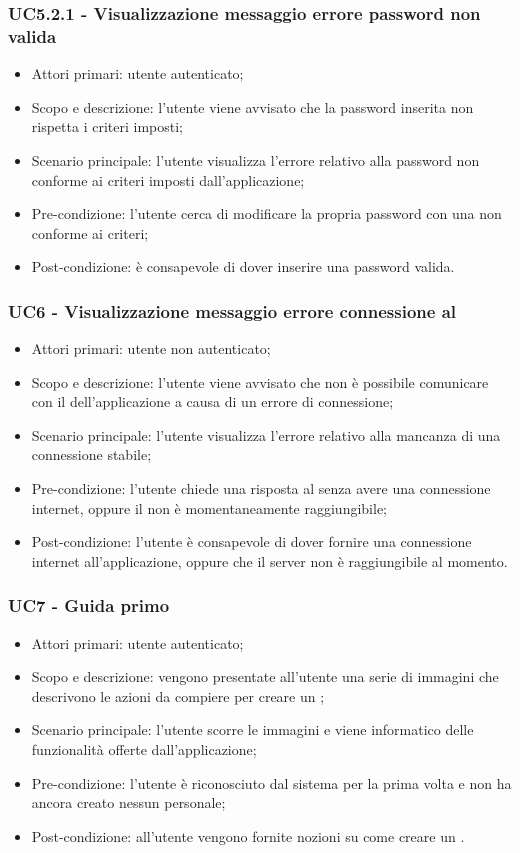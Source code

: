 \subsubsection{UC5.2.1 - Visualizzazione messaggio errore password non valida}
\begin{itemize}
	\item  Attori primari: utente autenticato;
	\item  Scopo e descrizione: l'utente viene avvisato che la password inserita non rispetta i criteri imposti;
	\item  Scenario principale: l'utente visualizza l'errore relativo alla password non conforme ai criteri imposti dall'applicazione;
	\item  Pre-condizione: l'utente cerca di modificare la propria password con una non conforme ai criteri;
	\item  Post-condizione: è consapevole di dover inserire una password valida.
\end{itemize}
\subsubsection{UC6 - Visualizzazione messaggio errore connessione al }
\begin{itemize}
	\item  Attori primari: utente non autenticato;
	\item  Scopo e descrizione: l'utente viene avvisato che non è possibile comunicare con il  dell'applicazione a causa di un errore di connessione;
	\item  Scenario principale: l'utente visualizza l'errore relativo alla mancanza di una connessione stabile;
	\item  Pre-condizione: l'utente chiede una risposta al  senza avere una connessione internet, oppure il  non è momentaneamente raggiungibile;
	\item  Post-condizione: l'utente è consapevole di dover fornire una connessione internet all'applicazione, oppure che il server non è raggiungibile al momento.
\end{itemize}
\subsubsection{UC7 - Guida primo }
\begin{itemize}
	\item  Attori primari: utente autenticato;
	\item  Scopo e descrizione: vengono presentate all'utente una serie di immagini che descrivono le azioni da compiere per creare un ;
	\item  Scenario principale: l'utente scorre le immagini e viene informatico delle funzionalità offerte dall'applicazione;
	\item  Pre-condizione: l'utente è riconosciuto dal sistema per la prima volta e non ha ancora creato nessun  personale;
	\item  Post-condizione: all'utente vengono fornite nozioni su come creare un .
\end{itemize}

